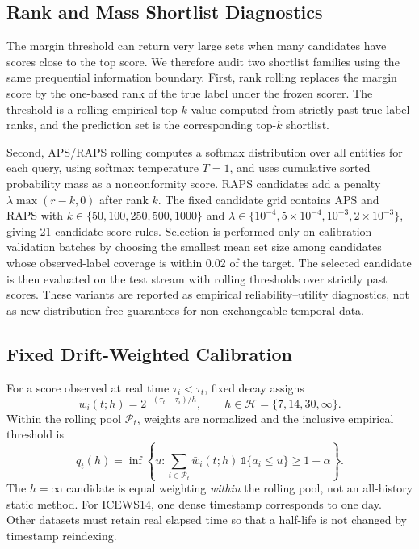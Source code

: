 \documentclass[information,article,submit,oneauthor,pdftex]{Definitions/mdpi}
\begin{document}
\subsection{Rank and Mass Shortlist Diagnostics}

The margin threshold can return very large sets when many candidates have scores
close to the top score. We therefore audit two shortlist families using the
same prequential information boundary. First, rank rolling replaces the margin
score by the one-based rank of the true label under the frozen scorer. The
threshold is a rolling empirical top-\(k\) value computed from strictly past
true-label ranks, and the prediction set is the corresponding top-\(k\)
shortlist.

Second, APS/RAPS rolling computes a softmax distribution over all entities for
each query, using softmax temperature \(T=1\), and uses cumulative sorted
probability mass as a nonconformity score. RAPS candidates add a penalty
\(\lambda\max(r-k,0)\) after rank \(k\). The fixed candidate grid contains APS
and RAPS with \(k\in\{50,100,250,500,1000\}\) and
\(\lambda\in\{10^{-4},5\times10^{-4},10^{-3},2\times10^{-3}\}\), giving 21
candidate score rules. Selection is performed only on calibration-validation
batches by choosing the smallest mean set size among candidates whose
observed-label coverage is within 0.02 of the target. The selected candidate is
then evaluated on the test stream with rolling thresholds over strictly past
scores. These variants are reported as empirical reliability--utility
diagnostics, not as new distribution-free guarantees for non-exchangeable
temporal data.

\subsection{Fixed Drift-Weighted Calibration}

For a score observed at real time \(\tau_i<\tau_t\), fixed decay assigns
\[
  w_i(t;h)=2^{-(\tau_t-\tau_i)/h},
  \qquad h\in\mathcal{H}=\{7,14,30,\infty\}.
\]
Within the rolling pool \(\mathcal{P}_t\), weights are normalized and the
inclusive empirical threshold is
\[
  q_t(h)=\inf\left\{u:
  \sum_{i\in\mathcal{P}_t}\bar{w}_i(t;h)\,
  \mathbb{1}\{a_i\leq u\}\geq 1-\alpha\right\}.
\]
The \(h=\infty\) candidate is equal weighting \emph{within} the rolling pool,
not an all-history static method. For ICEWS14, one dense timestamp corresponds
to one day. Other datasets must retain real elapsed time so that a half-life is
not changed by timestamp reindexing.
\end{document}
